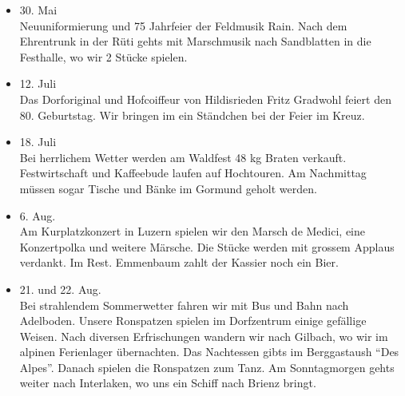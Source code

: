 \begin{multicols}{2}
\begin{itemize}
        \item[]30. Mai\\
        Neuuniformierung und 75 Jahrfeier der Feldmusik Rain. Nach dem
        Ehrentrunk in der Rüti gehts mit Marschmusik nach Sandblatten in die
        Festhalle, wo wir 2 Stücke spielen.

        \item[]12. Juli\\
        Das Dorforiginal und Hofcoiffeur von Hildisrieden Fritz Gradwohl feiert
        den 80. Geburtstag. Wir bringen im ein Ständchen bei der Feier im Kreuz.

        \item[]18. Juli\\
        Bei herrlichem Wetter werden am Waldfest 48 kg Braten verkauft.
        Festwirtschaft und Kaffeebude laufen auf Hochtouren. Am Nachmittag
        müssen sogar Tische und Bänke im Gormund geholt werden.

        \item[]6. Aug.\\
        Am Kurplatzkonzert in Luzern spielen wir den Marsch de Medici, eine
        Konzertpolka und weitere Märsche. Die Stücke werden mit grossem Applaus
        verdankt. Im Rest. Emmenbaum zahlt der Kassier noch ein Bier.

        \item[]21. und 22. Aug.\\
        Bei strahlendem Sommerwetter fahren wir mit Bus und Bahn nach Adelboden.
        Unsere Ronspatzen spielen im Dorfzentrum einige gefällige Weisen. Nach
        diversen Erfrischungen wandern wir nach Gilbach, wo wir im alpinen
        Ferienlager übernachten. Das Nachtessen gibts im Berggastaush "`Des
        Alpes"'. Danach spielen die Ronspatzen zum Tanz. Am Sonntagmorgen gehts
        weiter nach Interlaken, wo uns ein Schiff nach Brienz bringt.


    \end{itemize}

\end{multicols}
